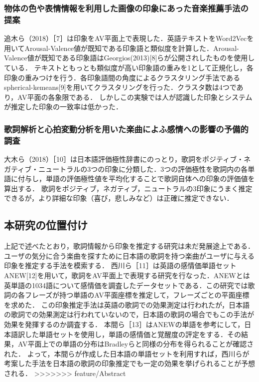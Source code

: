 \documentclass[a4paper,10pt,twocolumn]{jsarticle}
\begin{document}
\subsubsection{物体の色や表情情報を利用した画像の印象にあった音楽推薦手法の提案}
追木ら（2018）［7］は印象をAV平面上で表現した．英語テキストをWord2Vecを用いてArousal-Valence値が既知である印象語と類似度を計算した．Arousal-Valence値が既知である印象語はGeorgios(2013)[8]らが公開されしたものを使用している．
テキストともっとも類似度が高い印象語の重みを1として正規化し，各印象の重みつけを行う．各印象語間の角度によるクラスタリング手法であるspherical-kemeans[9]を用いてクラスタリングを行った．クラスタ数は4つであり，AV平面の各象限である．
しかしこの実験では人が認識した印象とシステムが推定した印象の一致率は低かった．

\subsubsection{歌詞解析と心拍変動分析を用いた楽曲によふ感情への影響の予備的調査}
大木ら（2018）［10］は日本語評価極性辞書にのっとり，歌詞をポジティブ・ネガティブ・ニュートラルの3つの印象に分類した．3つの評価極性を歌詞内の各単語に付与し，単語の評価極性値を平均化することで歌詞自体への印象の評価値を算出する．
歌詞をポジティブ，ネガティブ，ニュートラルの3印象にうまく推定できるが，より詳細な印象（喜び，悲しみなど）は正確に推定できない．

\subsection{本研究の位置付け}
上記で述べたとおり，歌詞情報から印象を推定する研究は未だ発展途上である．ユーザの気分に合う楽曲を探すために日本語の歌詞を持つ楽曲がユーザに与える印象を推定する手法を模索する．
西川ら［11］は英語の感情価単語セットANEW[12]を用いて，歌詞をAV平面上で表現する研究を行なった．ANEWとは英単語の1034語について感情価を調査したデータセットである．この研究では歌詞の各フレーズが持つ単語のAV平面座標を推定して，フレーズごとの平面座標を求めた．
この印象推定手法は英語の歌詞での効果測定は行われたが，日本語の歌詞での効果測定は行われていないので，日本語の歌詞の場合でもこの手法が効果を発揮するのか調査する．
本間ら［13］はANEWの単語を参考にして，日本語訳した単語セットを使用し，単語の感情価と覚醒度の評定をする．その結果，AV平面上での単語の分布はBradleyらと同様の分布を得られることが確認された．
よって，本間らが作成した日本語の単語セットを利用すれば，西川らが考案した手法を日本語の歌詞の印象推定でも一定の効果を挙げられることが予想される．
>>>>>>> feature/Abstract

%
\end{document}
